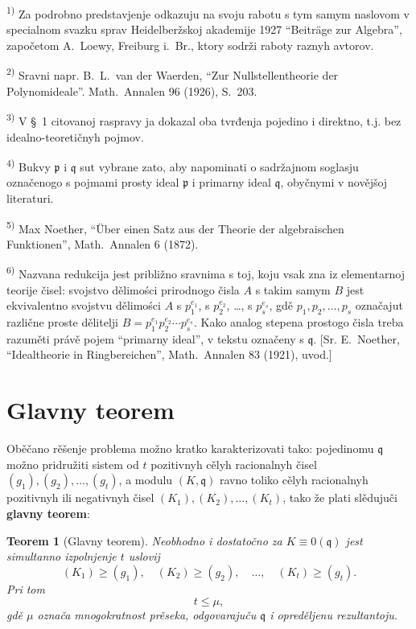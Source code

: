 \documentclass[11pt]{article}
\newcommand{\foreign}[1]{#1}
\theoremstyle{plain}
\newtheorem{satz}{Teorem}
\begin{document}
{\footnotesize
\textsuperscript{1)} Za podrobno predstavjenje odkazuju na svoju rabotu s tym samym
naslovom v specialnom svazku sprav Heidelberžskoj akademije 1927
``Beiträge zur Algebra'', započetom A.\ Loewy, Freiburg i.\ Br., ktory
sodrži raboty raznyh avtorov.

\textsuperscript{2)} Sravni napr. B.\ L.\ van der Waerden, ``Zur Nullstellentheorie der Polynomideale''.
\foreign{Math.\ Annalen} 96 (1926), S.~203.

\textsuperscript{3)} V \S~1 citovanoj raspravy ja dokazal oba tvrđenja pojedino i direktno,
t.j. bez idealno-teoretičnyh pojmov.

\textsuperscript{4)} Bukvy $\mathfrak{p}$ i $\mathfrak{q}$ sut vybrane zato, aby napominati
o sadržajnom soglasju označenogo s pojmami prosty ideal
$\mathfrak{p}$ i primarny ideal $\mathfrak{q}$, obyčnymi v novějšoj literaturi.

\textsuperscript{5)} Max Noether, ``Über einen Satz aus der Theorie der algebraischen Funktionen'',
\foreign{Math.\ Annalen} 6 (1872).

\textsuperscript{6)} Nazvana redukcija jest približno sravnima s toj, koju vsak zna iz
elementarnoj teorije čisel: svojstvo dělimości prirodnogo čisla
$A$ s takim samym $B$ jest ekvivalentno svojstvu dělimości $A$ s
$p_{1}^{e_{1}}$, s $p_{2}^{e_{2}}$, \ldots, s $p_{s}^{e_{s}}$, gdě
$p_{1}, p_{2}, \ldots, p_{s}$ označajut različne proste dělitelji
$B = p_{1}^{e_{1}}p_{2}^{e_{2}} \cdots p_{s}^{e_{s}}$. Kako analog
stepena prostogo čisla treba razuměti právě pojem ``primarny ideal'',
v tekstu označeny s $\mathfrak{q}$. [Sr. E.\ Noether,
``Idealtheorie in Ringbereichen'', \foreign{Math.\ Annalen} 83 (1921), uvod.]
}

\newpage
\section*{Glavny teorem}

Oběčano rěšenje problema možno kratko karakterizovati tako:
pojedinomu $\mathfrak{q}$ možno pridružiti sistem od $t$ pozitivnyh
cělyh racionalnyh čisel $(g_{1}), (g_{2}), \ldots, (g_{t})$, a
modulu $(K, \mathfrak{q})$ ravno toliko cělyh racionalnyh pozitivnyh
ili negativnyh čisel $(K_{1}), (K_{2}), \ldots, (K_{t})$, tako že
plati slědujuči \textbf{glavny teorem}:

\begin{satz}[Glavny teorem]\label{satz:kap-II}
Neobhodno i dostatočno za $K \equiv 0(\mathfrak{q})$ jest
simultanno izpolnjenje $t$ uslovij
\[
(K_{1}) \geq (g_{1}), \quad (K_{2}) \geq (g_{2}), \quad\ldots,\quad (K_{t}) \geq (g_{t}).
\]
Pri tom
\[
t \leq \mu,
\]
gdě $\mu$ označa mnogokratnost prěseka, odgovarajuču
$\mathfrak{q}$ i opreděljenu rezultantoju.
\end{satz}
\end{document}
